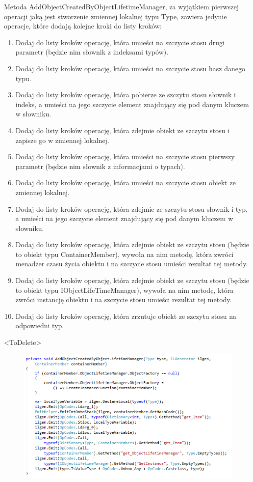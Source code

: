 \documentclass[12pt]{article}
\begin{document}
Metoda AddObjectCreatedByObjectLifetimeManager, za wyjątkiem pierwszej operacji jaką jest stworzenie zmiennej lokalnej typu Type, zawiera jedynie operacje, które dodają kolejne kroki do listy kroków:
\begin{enumerate}
	\item Dodaj do listy kroków operację, która umieści na szczycie stosu drugi parametr (będzie nim słownik z indeksami typów).
	\item Dodaj do listy kroków operację, która umieści na szczycie stosu hasz danego typu.
	\item Dodaj do listy kroków operację, która pobierze ze szczytu stosu słownik i indeks, a umieści na jego szczycie element znajdujący się pod danym kluczem w słowniku.
	\item Dodaj do listy kroków operację, która zdejmie obiekt ze szczytu stosu i zapisze go w zmiennej lokalnej.
	\item Dodaj do listy kroków operację, która umieści na szczycie stosu pierwszy parametr (będzie nim słownik z informacjami o typach).
	\item Dodaj do listy kroków operację, która umieści na szczycie stosu obiekt ze zmiennej lokalnej.
	\item Dodaj do listy kroków operację, która zdejmie ze szczytu stosu słownik i typ, a umieści na jego szczycie element znajdujący się pod danym kluczem w słowniku.
	\item Dodaj do listy kroków operację, która zdejmie obiekt ze szczytu stosu (będzie to obiekt typu ContainerMember), wywoła na nim metodę, która zwróci menadżer czasu życia obiektu i na szczycie stosu umieści rezultat tej metody.
	\item Dodaj do listy kroków operację, która zdejmie obiekt ze szczytu stosu (będzie to obiekt typu IObjectLifeTimeManager), wywoła na nim metodę, która zwróci instancję obiektu i na szczycie stosu umieści rezultat tej metody.
	\item Dodaj do listy kroków operację, która zrzutuje obiekt ze szczytu stosu na odpowiedni typ.
\end{enumerate}
<ToDelete>
\begin{figure}[h]
	\begin{raggedleft}
  		\includegraphics{FullEmitFunction_AddObjectCreatedByObjectLifetimeManager.png}
	\end{raggedleft}
\end{figure}\\
\end{document}
